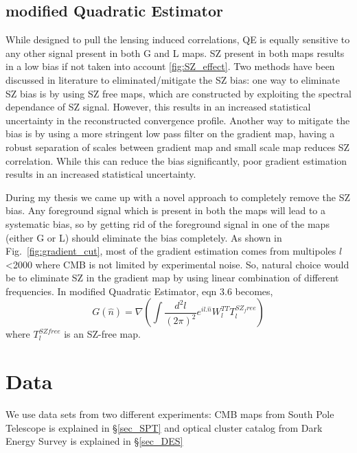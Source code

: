 \subsection{modified Quadratic Estimator}
While designed to pull the lensing induced correlations, QE is equally sensitive to any other signal present in both G and L maps.
 SZ present in both maps results in a low bias if not taken into account \ref{fig:SZ_effect}.
 Two methods have been discussed in literature to eliminated/mitigate the SZ bias:
 one way to eliminate SZ bias is by using SZ free maps, which are constructed by exploiting the spectral dependance of SZ signal.
 However, this results in an increased statistical uncertainty in the reconstructed convergence profile.
 Another way to mitigate the bias is by using a more stringent low pass filter on the gradient map, having a robust separation of scales between gradient map and small scale map reduces SZ correlation.
 While this can reduce the bias significantly,  poor gradient estimation results in an increased statistical uncertainty.

 
 During my thesis we came up with a novel approach to completely remove the SZ bias. 
 Any foreground signal which is present in both the maps will lead to a systematic bias, so by getting rid of the foreground signal in one of the maps (either G or L) should eliminate the bias completely.
  As shown in Fig.~\ref{fig:gradient_cut}, most of the gradient estimation comes from multipoles $l$ <2000 where CMB is not limited by experimental noise.
  So, natural choice would be to eliminate SZ in the gradient map by using linear combination of different frequencies. 
  In modified Quadratic Estimator, eqn 3.6 becomes,
  \begin{equation}
   G(\hat{n}) = \nabla (\int\frac{d^{2}l}{(2\pi)^{2}} e^{il .\hat{n}} W^{TT}_{l} T^{SZ_free}_{l}   )
  \end{equation}
  where $T^{SZ free}_{l} $ is an SZ-free map.
\section{Data}
\label{sec_data}
We use data sets from two different experiments: CMB maps from South Pole Telescope is explained in \S\ref{sec_SPT} and 
optical cluster catalog from Dark Energy Survey is explained in \S\ref{sec_DES}

